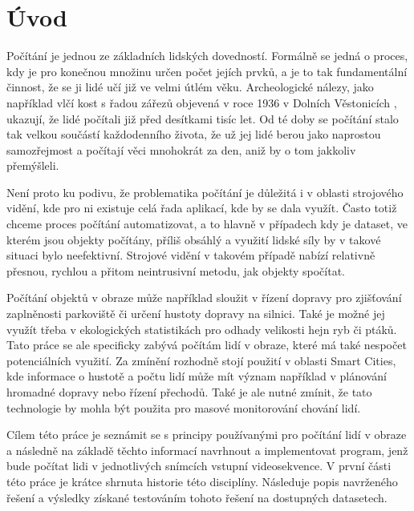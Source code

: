 \chapter{Úvod}
\label{sec:Introduction}
Počítání je jednou ze základních lidských dovedností. Formálně se jedná o proces, kdy je pro konečnou množinu určen počet jejích prvků, a je to tak fundamentální činnost, že se ji lidé učí již ve velmi útlém věku.
Archeologické nálezy, jako například vlčí kost s řadou zářezů objevená v roce 1936 v Dolních Věstonicích \cite{vestonice}, ukazují, že lidé počítali již před desítkami tisíc let.
Od té doby se počítání stalo tak velkou součástí každodenního života, že už jej lidé berou jako naprostou samozřejmost a počítají věci mnohokrát za den, aniž by o tom jakkoliv přemýšleli.

Není proto ku podivu, že problematika počítání je důležitá i v oblasti strojového vidění, kde pro ni existuje celá řada aplikací, kde by se dala využít.
Často totiž chceme proces počítání automatizovat, a to hlavně v případech kdy je dataset, ve kterém jsou objekty počítány, příliš obsáhlý a využití lidské síly by v takové situaci bylo neefektivní.
Strojové vidění v takovém případě nabízí relativně přesnou, rychlou a přitom neintrusivní metodu, jak objekty spočítat.

Počítání objektů v obraze může například sloužit v řízení dopravy pro zjišťování zaplněnosti parkoviště či určení hustoty dopravy na silnici. Také je možné jej využít třeba v ekologických statistikách pro odhady velikosti hejn ryb či ptáků.
Tato práce se ale specificky zabývá počítám lidí v obraze, které má také nespočet potenciálních využití.
Za zmínění rozhodně stojí použití v oblasti Smart Cities, kde informace o hustotě a počtu lidí může mít význam například v plánování hromadné dopravy nebo řízení přechodů.
Také je ale nutné zmínit, že tato technologie by mohla být použita pro masové monitorování chování lidí.

Cílem této práce je seznámit se s principy používanými pro počítání lidí v obraze a následně na základě těchto informací navrhnout a implementovat program, jenž bude počítat lidi v jednotlivých snímcích vstupní videosekvence.
V první části této práce je krátce shrnuta historie této disciplíny. Následuje popis navrženého řešení a  výsledky získané testováním tohoto řešení na dostupných datasetech.


\endinput